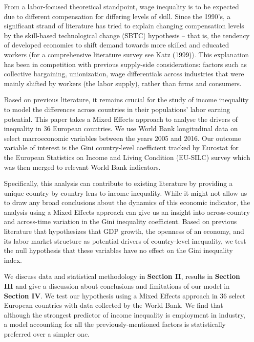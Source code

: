 \documentclass[
]{article}
\begin{document}
From a labor-focused theoretical standpoint, wage inequality is to be
expected due to different compensation for differing levels of skill.
Since the 1990's, a significant strand of literature has tried to
explain changing compensation levels by the skill-based technological
change (SBTC) hypothesis -- that is, the tendency of developed economies
to shift demand towards more skilled and educated workers (for a
comprehensive literature survey see Katz (1999)). This explanation has
been in competition with previous supply-side considerations: factors
such as collective bargaining, unionization, wage differentials across
industries that were mainly shifted by workers (the labor supply),
rather than firms and consumers.

Based on previous literature, it remains crucial for the study of income
inequality to model the differences across countries in their
populations' labor earning potential. This paper takes a Mixed Effects
approach to analyse the drivers of inequality in 36 European countries.
We use World Bank longitudinal data on select macroeconomic variables
between the years 2005 and 2016. Our outcome variable of interest is the
Gini country-level coefficient tracked by Eurostat for the European
Statistics on Income and Living Condition (EU-SILC) survey which was
then merged to relevant World Bank indicators.

Specifically, this analysis can contribute to existing literature by
providing a unique country-by-country lens to income inequality. While
it might not allow us to draw any broad conclusions about the dynamics
of this economic indicator, the analysis using a Mixed Effects approach
can give us an insight into across-country and across-time variation in
the Gini inequality coefficient. Based on previous literature that
hypothesizes that GDP growth, the openness of an economy, and its labor
market structure as potential drivers of country-level inequality, we
test the null hypothesis that these variables have no effect on the Gini
inequality index.

We discuss data and statistical methodology in \textbf{Section II},
results in \textbf{Section III} and give a discussion about conclusions
and limitations of our model in \textbf{Section IV}. We test our
hypothesis using a Mixed Effects approach in 36 select European
countries with data collected by the World Bank. We find that although
the strongest predictor of income inequality is employment in industry,
a model accounting for all the previously-mentioned factors is
statistically preferred over a simpler one.
\end{document}
